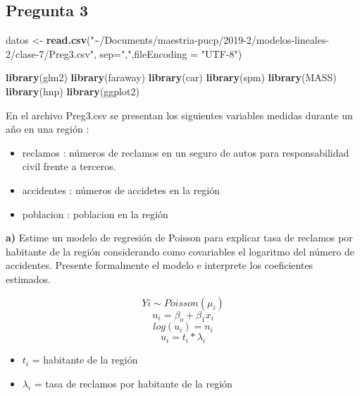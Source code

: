 \documentclass[]{article}
\newenvironment{Shaded}{\begin{snugshade}}{\end{snugshade}}
\newcommand{\DataTypeTok}[1]{\textcolor[rgb]{0.13,0.29,0.53}{#1}}
\newcommand{\KeywordTok}[1]{\textcolor[rgb]{0.13,0.29,0.53}{\textbf{#1}}}
\newcommand{\NormalTok}[1]{#1}
\newcommand{\StringTok}[1]{\textcolor[rgb]{0.31,0.60,0.02}{#1}}
\providecommand{\tightlist}{%
  \setlength{\itemsep}{0pt}\setlength{\parskip}{0pt}}
\begin{document}
\hypertarget{pregunta-3}{%
\subsection{Pregunta 3}\label{pregunta-3}}

\begin{Shaded}
\begin{Highlighting}[]
\NormalTok{datos <{-}}\StringTok{ }\KeywordTok{read.csv}\NormalTok{(}\StringTok{"\textasciitilde{}/Documents/maestria{-}pucp/2019{-}2/modelos{-}lineales{-}2/clase{-}7/Preg3.csv"}\NormalTok{, }\DataTypeTok{sep=}\StringTok{","}\NormalTok{,}\DataTypeTok{fileEncoding =} \StringTok{"UTF{-}8"}\NormalTok{)}
\end{Highlighting}
\end{Shaded}

\begin{Shaded}
\begin{Highlighting}[]
\KeywordTok{library}\NormalTok{(glm2)}
\KeywordTok{library}\NormalTok{(faraway)}
\KeywordTok{library}\NormalTok{(car)}
\KeywordTok{library}\NormalTok{(spm)}
\KeywordTok{library}\NormalTok{(MASS)}
\KeywordTok{library}\NormalTok{(hnp)}
\KeywordTok{library}\NormalTok{(ggplot2)}
\end{Highlighting}
\end{Shaded}

En el archivo Preg3.csv se presentan los siguientes variables medidas
durante un año en una región :

\begin{itemize}
\item
  reclamos : números de reclamos en un seguro de autos para
  responsabilidad civil frente a terceros.
\item
  accidentes : números de accidetes en la región
\item
  poblacion : poblacion en la región
\end{itemize}

\textbf{a)} Estime un modelo de regresión de Poisson para explicar tasa
de reclamos por habitante de la región considerando como covariables el
logaritmo del número de accidentes. Presente formalmente el modelo e
interprete los coeficientes estimados.

\[ Yi  \sim Poisson(\mu_i)\] \[ n_i  = \beta_o + \beta_1 x_i \]
\[ log(u_i)  = n_i \] \[ u_i  = t_i * \lambda_i\]

\begin{itemize}
\tightlist
\item
  \(t_i\) = habitante de la región
\item
  \(\lambda_i\) = tasa de reclamos por habitante de la región
\end{itemize}
\end{document}
